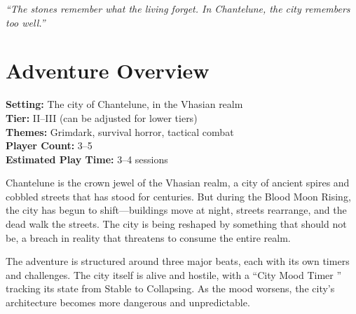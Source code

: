 \documentclass{article}
\begin{document}




\begin{center}
\textit{``The stones remember what the living forget. In Chantelune, the city remembers too well.''}
\end{center}

\begin{abstract}
The city of Chantelune, jewel of the Vhasian realm, is unraveling. During the Blood Moon Rising, the city shifts at night---buildings move, streets rearrange, and the dead walk the streets. The city is being reshaped by something that should not be, a breach in reality that threatens to consume the entire realm. This adventure is designed for Fate's Edge and specifically targets fans of Warhammer 40k, preserving grimdark atmosphere and tactical combat while emphasizing narrative consequences. The city itself is alive and hostile, with a ``City Mood Timer '' tracking its state from Stable to Collapsing. Players must survive the shifting city, find the source of the shifting, and seal the breach before the city is lost forever.
\end{abstract}


\section{Adventure Overview}

\begin{adventurebox}
\textbf{Setting:} The city of Chantelune, in the Vhasian realm \\
\textbf{Tier:} II--III (can be adjusted for lower tiers) \\
\textbf{Themes:} Grimdark, survival horror, tactical combat \\
\textbf{Player Count:} 3--5 \\
\textbf{Estimated Play Time:} 3--4 sessions
\end{adventurebox}

Chantelune is the crown jewel of the Vhasian realm, a city of ancient spires and cobbled streets that has stood for centuries. But during the Blood Moon Rising, the city has begun to shift---buildings move at night, streets rearrange, and the dead walk the streets. The city is being reshaped by something that should not be, a breach in reality that threatens to consume the entire realm.

The adventure is structured around three major beats, each with its own timers and challenges. The city itself is alive and hostile, with a ``City Mood Timer '' tracking its state from Stable to Collapsing. As the mood worsens, the city's architecture becomes more dangerous and unpredictable.
\end{document}
